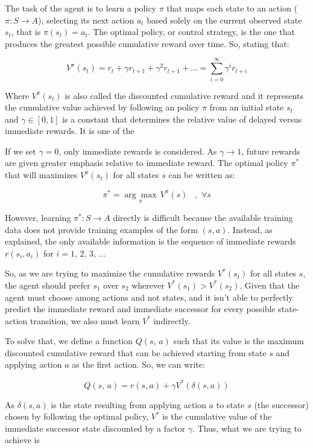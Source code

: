 \documentclass[a4paper]{article}
\begin{document}
The task of the agent is to learn a policy $\pi$ that maps each state to an action ($\pi: S \rightarrow A$), selecting its next action $a_t$ based solely on the current observed state $s_t$, that is $\pi(s_t)=a_t$. The optimal policy, or control strategy, is the one that produces the greatest possible cumulative reward over time. So, stating that:

$$V^{\pi}(s_t)= r_t + \gamma r_{t+1} + \gamma^2 r_{t+1} + ... = \sum_{i=0}^{\infty} \gamma^{i} r_{t+i}$$

Where $V^{\pi}(s_t)$ is also called the discounted cumulative reward and it represents the cumulative value achieved by following an policy $\pi$ from an initial state $s_t$ and $\gamma \in [0, 1]$ is a constant that determines the relative value of delayed versus immediate rewards. It is one of the

If we set $\gamma=0$, only immediate rewards is considered. As $\gamma \rightarrow 1$, future rewards are given greater emphasis relative to immediate reward. The optimal policy $\pi^{*}$ that will maximizes $V^{\pi}(s_t)$ for all states $s$ can be written as:

$$\pi^{*} = \underset{\pi}{\arg \max} \, V^{\pi} (s)\,\,\,\,\,, \,\, \forall s$$

However, learning $\pi^{*}: S \rightarrow A$ directly is difficult because the available training data does not provide training examples of the form $(s, a)$. Instead, as \cite{Mitchell} explained, the only available information is the sequence of immediate rewards $r(s_i, a_i)$ for $i=1,\, 2,\, 3,\,...$

So, as we are trying to maximize the cumulative rewards $V^{*}(s_t)$ for all states $s$, the agent should prefer $s_1$ over $s_2$ wherever $V^{*}(s_1) > V^{*}(s_2)$. Given that the agent must choose among actions and not states, and it isn't able to perfectly predict the immediate reward and immediate successor for every possible state-action transition, we also must learn $V^{*}$ indirectly.

To solve that, we define a function $Q(s, \, a)$ such that its value is the maximum discounted cumulative reward that can be achieved starting from state $s$ and applying action $a$ as the first action. So, we can write:

$$Q(s, \, a) = r(s, a) + \gamma V^{*}(\delta(s, a))$$

As $\delta(s, a)$ is the state resulting from applying action $a$ to state $s$ (the successor) chosen by following the optimal policy, $V^{*}$ is the cumulative value of the immediate successor state discounted by a factor $\gamma$. Thus,  what we are trying to achieve is
\end{document}
